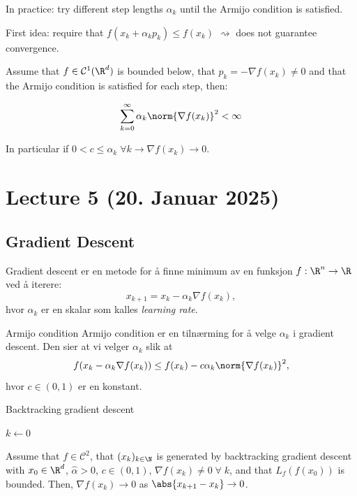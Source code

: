 In practice: try different step lengths  \(\alpha_k\) until the Armijo condition is satisfied.

First idea: require that  \(f(x_k + \alpha_k p_k) \leq f(x_k)\)  \(\rightsquigarrow\) does not guarantee convergence.

\begin{lemma}{}{}
	Assume that  \(f \in \mathcal{C}^1(\R^d)\) is bounded below, that  \(p_k = - \nabla f(x_k) \neq 0\) and that the Armijo condition is satisfied for each step, then:

	\[
		\sum_{k=0}^{\infty} \alpha_k \norm{\nabla f(x_k)}^2 < \infty
	\]

	In particular if  \(0 < c \leq \alpha_k \; \forall k \rightarrow \nabla f(x_k) \rightarrow 0\).
\end{lemma}

\section{Lecture 5 (20. Januar 2025)}
\subsection*{Gradient Descent}


Gradient descent er en metode for å finne minimum av en funksjon  \(f: \R^n \to \R\) ved å iterere:
\[
	x_{k+1} = x_k - \alpha_k \nabla f(x_k),
\]
hvor  \(\alpha_k\) er en skalar som kalles \emph{learning rate}.

\begin{remark}{Armijo condition}{}
	Armijo condition er en tilnærming for å velge  \(\alpha_k\) i gradient descent. Den sier at vi velger  \(\alpha_k\) slik at
	\[
		f(x_k - \alpha_k \nabla f(x_k)) \leq f(x_k) - c \alpha_k \norm{\nabla f(x_k)}^2,
	\]
	hvor  \(c \in (0, 1)\) er en konstant.
\end{remark}


\begin{algorithm}
	\caption{Backtracking gradient descent}
	\SetAlgoLined
	\(k \gets 0\)\;
\end{algorithm}


\begin{theorem}{}{}
	Assume that  \(f \in \mathcal{C}^2\), that  \((x_k)_{k \in \N}\)
	is generated by backtracking gradient descent with
	\(x_0 \in \R^d\),  \(\hat{\alpha} > 0\), \(c \in (0, 1)\),  \(\nabla f(x_k) \neq 0 \; \forall \; k\), and that
	\(L_f(f(x_0))\) is bounded. Then,  \(\nabla f(x_k) \to 0\) as  \(\abs{x_{k+1} - x_k} \to 0\).
\end{theorem}

